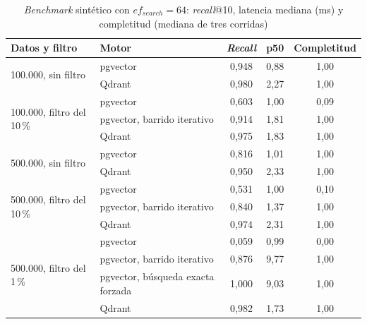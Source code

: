 \begin{table}[htbp!]
    \centering
    \caption{\textit{Benchmark} sintético con $ef_{search} = 64$: \textit{recall}@10, latencia mediana (ms) y completitud (mediana de tres corridas)}
    \label{tab:res-bench-sint}
    \footnotesize
    \begin{tabular}{|l|l|c|c|c|}
        \hline
        \textbf{Datos y filtro} & \textbf{Motor} & \textbf{\textit{Recall}} & \textbf{p50} & \textbf{Completitud} \\
        \hline
        \multirow{2}{*}{100.000, sin filtro} & pgvector & 0{,}948 & 0{,}88 & 1{,}00 \\
                 & Qdrant & 0{,}980 & 2{,}27 & 1{,}00 \\
        \hline
        \multirow{3}{*}{100.000, filtro del 10\,\%} & pgvector & 0{,}603 & 1{,}00 & 0{,}09 \\
                 & pgvector, barrido iterativo & 0{,}914 & 1{,}81 & 1{,}00 \\
                 & Qdrant & 0{,}975 & 1{,}83 & 1{,}00 \\
        \hline
        \multirow{2}{*}{500.000, sin filtro} & pgvector & 0{,}816 & 1{,}01 & 1{,}00 \\
                 & Qdrant & 0{,}950 & 2{,}33 & 1{,}00 \\
        \hline
        \multirow{3}{*}{500.000, filtro del 10\,\%} & pgvector & 0{,}531 & 1{,}00 & 0{,}10 \\
                 & pgvector, barrido iterativo & 0{,}840 & 1{,}37 & 1{,}00 \\
                 & Qdrant & 0{,}974 & 2{,}31 & 1{,}00 \\
        \hline
        \multirow{4}{*}{500.000, filtro del 1\,\%} & pgvector & 0{,}059 & 0{,}99 & 0{,}00 \\
                 & pgvector, barrido iterativo & 0{,}876 & 9{,}77 & 1{,}00 \\
                 & pgvector, búsqueda exacta forzada & 1{,}000 & 9{,}03 & 1{,}00 \\
                 & Qdrant & 0{,}982 & 1{,}73 & 1{,}00 \\
        \hline
    \end{tabular}
\end{table}
